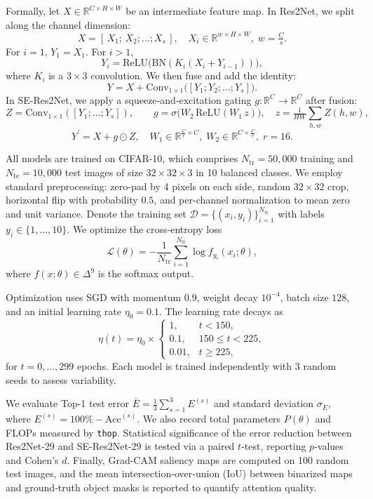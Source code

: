 \documentclass{article}
\begin{document}
Formally, let $X\in\mathbb{R}^{C\times H\times W}$ be an intermediate feature map.  In Res2Net, we split along the channel dimension:
\[
X = [\,X_1;\,X_2;\dots;X_s\,],\quad X_i\in\mathbb{R}^{w\times H\times W},\;w=\tfrac{C}{s}.
\]
For $i=1$, $Y_1 = X_1$.  For $i>1$, 
\[
Y_i = \mathrm{ReLU}\bigl(\mathrm{BN}(K_i(X_i + Y_{i-1}))\bigr),
\]
where $K_i$ is a $3\times3$ convolution.  We then fuse and add the identity:
\[
Y = X + \mathrm{Conv}_{1\times1}\bigl([Y_1;Y_2;\dots;Y_s]\bigr).
\]
In SE-Res2Net, we apply a squeeze‐and‐excitation gating $g:\mathbb{R}^C\to\mathbb{R}^C$ after fusion:
\[
Z = \mathrm{Conv}_{1\times1}([Y_1;\dots;Y_s]),\qquad
g = \sigma\bigl(W_2\,\mathrm{ReLU}(W_1\,z)\bigr),\quad z = \tfrac{1}{H W}\sum_{h,w}Z(h,w),
\]
\[
Y^\prime = X + g\odot Z,\quad W_1\in\mathbb{R}^{\frac{C}{r}\times C},\;W_2\in\mathbb{R}^{C\times\frac{C}{r}},\;r=16.
\]

All models are trained on CIFAR-10, which comprises $N_{\mathrm{tr}}=50{,}000$ training and $N_{\mathrm{te}}=10{,}000$ test images of size $32\times32\times3$ in 10 balanced classes.  We employ standard preprocessing: zero-pad by 4 pixels on each side, random $32\times32$ crop, horizontal flip with probability $0.5$, and per-channel normalization to mean zero and unit variance.  Denote the training set $\mathcal{D}=\{(x_i,y_i)\}_{i=1}^{N_{\mathrm{tr}}}$ with labels $y_i\in\{1,\dots,10\}$.  We optimize the cross‐entropy loss
\[
\mathcal{L}(\theta) = -\frac{1}{N_{\mathrm{tr}}}\sum_{i=1}^{N_{\mathrm{tr}}}\log f_{y_i}(x_i;\theta),
\]
where $f(x;\theta)\in\Delta^{9}$ is the softmax output.

Optimization uses SGD with momentum $0.9$, weight decay $10^{-4}$, batch size $128$, and an initial learning rate $\eta_0=0.1$.  The learning rate decays as
\[
\eta(t) = \eta_0 \times
\begin{cases}
1, & t<150,\\
0.1, & 150\le t<225,\\
0.01, & t\ge225,
\end{cases}
\]
for $t=0,\dots,299$ epochs.  Each model is trained independently with 3 random seeds to assess variability.

We evaluate Top-1 test error $\bar E = \tfrac{1}{3}\sum_{s=1}^3 E^{(s)}$ and standard deviation $\sigma_E$, where $E^{(s)}=100\%-\mathrm{Acc}^{(s)}$.  We also record total parameters $P(\theta)$ and FLOPs measured by \texttt{thop}.  Statistical significance of the error reduction between Res2Net-29 and SE-Res2Net-29 is tested via a paired $t$‐test, reporting $p$‐values and Cohen’s $d$.  Finally, Grad-CAM saliency maps are computed on 100 random test images, and the mean intersection‐over‐union (IoU) between binarized maps and ground‐truth object masks is reported to quantify attention quality.
\end{document}
